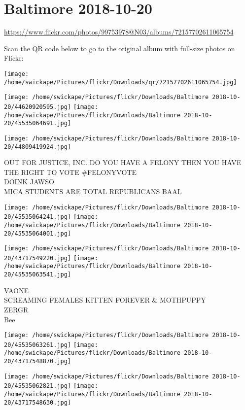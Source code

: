 \documentclass[10pt,letterpaper]{article}
\title{}
\author{}
\date{}
\begin{document}
\section*{Baltimore 2018-10-20}

\url{https://www.flickr.com/photos/99753978@N03/albums/72157702611065754}

Scan the QR code below to go to the original album with full-size photos on Flickr:

\texttt{[image: /home/swickape/Pictures/flickr/Downloads/qr/72157702611065754.jpg]}
\pagebreak

\texttt{[image: /home/swickape/Pictures/flickr/Downloads/Baltimore 2018-10-20/44620920595.jpg]}
\texttt{[image: /home/swickape/Pictures/flickr/Downloads/Baltimore 2018-10-20/45535064691.jpg]}

\vspace{0.25in}
\texttt{[image: /home/swickape/Pictures/flickr/Downloads/Baltimore 2018-10-20/44809419924.jpg]}

OUT FOR JUSTICE, INC. DO YOU HAVE A FELONY THEN YOU HAVE THE RIGHT TO VOTE \#FELONYVOTE\\
DOINK JAWSO\\
MICA STUDENTS ARE TOTAL REPUBLICANS BAAL
\pagebreak

\texttt{[image: /home/swickape/Pictures/flickr/Downloads/Baltimore 2018-10-20/45535064241.jpg]}
\texttt{[image: /home/swickape/Pictures/flickr/Downloads/Baltimore 2018-10-20/45535064001.jpg]}

\texttt{[image: /home/swickape/Pictures/flickr/Downloads/Baltimore 2018-10-20/43717549220.jpg]}
\texttt{[image: /home/swickape/Pictures/flickr/Downloads/Baltimore 2018-10-20/45535063541.jpg]}

VAONE\\
SCREAMING FEMALES KITTEN FOREVER \& MOTHPUPPY\\
ZERGR\\
Bee
\pagebreak

\texttt{[image: /home/swickape/Pictures/flickr/Downloads/Baltimore 2018-10-20/45535063261.jpg]}
\texttt{[image: /home/swickape/Pictures/flickr/Downloads/Baltimore 2018-10-20/43717548870.jpg]}

\texttt{[image: /home/swickape/Pictures/flickr/Downloads/Baltimore 2018-10-20/45535062821.jpg]}
\texttt{[image: /home/swickape/Pictures/flickr/Downloads/Baltimore 2018-10-20/43717548630.jpg]}
\end{document}
